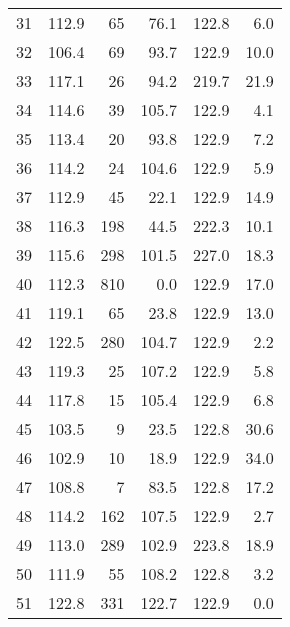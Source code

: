 \begin{tabular}{|r|r|r|r|r|r|}
31 &  112.9 & 65 & 76.1 & 122.8 & 6.0\\
32 &  106.4 & 69 & 93.7 & 122.9 & 10.0\\
33 &  117.1 & 26 & 94.2 & 219.7 & 21.9\\
34 &  114.6 & 39 & 105.7 & 122.9 & 4.1\\
35 &  113.4 & 20 & 93.8 & 122.9 & 7.2\\
36 &  114.2 & 24 & 104.6 & 122.9 & 5.9\\
37 &  112.9 & 45 & 22.1 & 122.9 & 14.9\\
38 &  116.3 & 198 & 44.5 & 222.3 & 10.1\\
39 &  115.6 & 298 & 101.5 & 227.0 & 18.3\\
40 &  112.3 & 810 & 0.0 & 122.9 & 17.0\\
41 &  119.1 & 65 & 23.8 & 122.9 & 13.0\\
42 &  122.5 & 280 & 104.7 & 122.9 & 2.2\\
43 &  119.3 & 25 & 107.2 & 122.9 & 5.8\\
44 &  117.8 & 15 & 105.4 & 122.9 & 6.8\\
45 &  103.5 & 9 & 23.5 & 122.8 & 30.6\\
46 &  102.9 & 10 & 18.9 & 122.9 & 34.0\\
47 &  108.8 & 7 & 83.5 & 122.8 & 17.2\\
48 &  114.2 & 162 & 107.5 & 122.9 & 2.7\\
49 &  113.0 & 289 & 102.9 & 223.8 & 18.9\\
50 &  111.9 & 55 & 108.2 & 122.8 & 3.2\\
51 &  122.8 & 331 & 122.7 & 122.9 & 0.0\\
\hline
\end{tabular}
